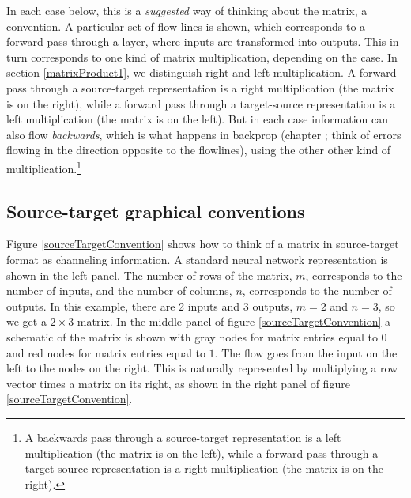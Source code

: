 In each case below, this is a \emph{suggested} way of thinking about the matrix, a convention. A particular set of flow lines is shown, which corresponds to a forward pass through a layer, where inputs are transformed into outputs. This in turn corresponds to one kind of matrix multiplication, depending on the case. In section \ref{matrixProduct1}, we distinguish right and left multiplication. A forward pass through a source-target representation is a right multiplication (the matrix is on the right), while a forward pass through a target-source representation is a left multiplication (the matrix is on the left). But in each case information can also flow \emph{backwards}, which is what happens in backprop (chapter ; think of errors flowing in the direction opposite to the flowlines), using the other other kind of multiplication.\footnote{A backwards pass through a source-target representation is a left multiplication (the matrix is on the left), while a forward pass through a target-source representation is a right multiplication (the matrix is on the right).}

\subsection{Source-target graphical conventions}

   Figure \ref{sourceTargetConvention} shows how to think of a matrix in 
source-target format as channeling information. A standard neural network representation is shown in
the left panel. The number of rows of the matrix, $m$, corresponds to the 
number of inputs, and the number of columns, $n$, corresponds to the number of 
outputs. In this example, there are 2 inputs and 3 outputs, $m=2$ and $n=3$, 
so we get a $2 \times 3$ matrix. In the middle panel of figure 
\ref{sourceTargetConvention} a schematic of the matrix is shown with gray nodes 
for matrix entries equal to $0$ and red nodes for matrix entries equal to $1$.
The flow goes from the input on the left to the nodes on the right. This is 
naturally represented by multiplying a row vector times a matrix on its right,
as shown in the right panel of figure \ref{sourceTargetConvention}. 


